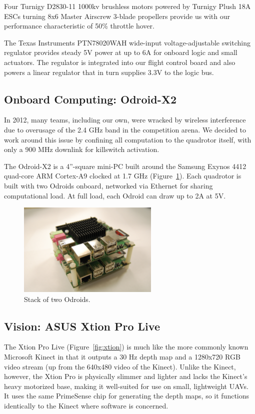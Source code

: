 \documentclass[12pt,letterpaper]{article} \usepackage[margin=1in]{geometry}
\begin{document}
Four Turnigy D2830-11 1000kv brushless motors powered by Turnigy Plush 18A ESCs
turning 8x6 Master Airscrew 3-blade propellers provide us with our performance
characteristic of 50\% throttle hover.

The Texas Instruments PTN78020WAH wide-input voltage-adjustable switching
regulator provides steady 5V power at up to 6A for onboard logic and small
actuators. The regulator is integrated into our flight control board and also
powers a linear regulator that in turn supplies 3.3V to the logic bus.


\subsection*{Onboard Computing: Odroid-X2}

In 2012, many teams, including our own, were wracked by wireless interference
due to overusage of the 2.4 GHz band in the competition arena. We decided to
work around this issue by confining all computation to the quadrotor itself,
with only a 900 MHz downlink for killswitch activation.

The Odroid-X2 is a 4''-square mini-PC built around the Samsung Exynos 4412
quad-core ARM Cortex-A9 clocked at 1.7 GHz (Figure~\ref{fig:odroids}). Each
quadrotor is built with two Odroids onboard, networked via Ethernet for sharing
computational load. At full load, each Odroid can draw up to 2A at 5V.

\begin{figure}[!h]
	\centering
	\includegraphics[width=0.6\textwidth]{img/odroid_stack.jpg}
	\caption{Stack of two Odroids.}
	\label{fig:odroids}
\end{figure}


\subsection*{Vision: ASUS Xtion Pro Live}

The Xtion Pro Live (Figure~\ref{fig:xtion}) is much like the more commonly
known Microsoft Kinect in that it outputs a 30 Hz depth map and a 1280x720 RGB
video stream (up from the 640x480 video of the Kinect). Unlike the Kinect,
however, the Xtion Pro is physically slimmer and lighter and lacks the Kinect's
heavy motorized base, making it well-suited for use on small, lightweight UAVs.
It uses the same PrimeSense chip for generating the depth maps, so it functions
identically to the Kinect where software is concerned.
\end{document}
